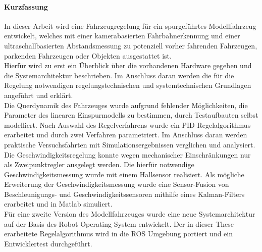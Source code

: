 
\cleardoublepage
\thispagestyle{plain}

\paragraph{Kurzfassung}
In dieser Arbeit wird eine Fahrzeugregelung für ein spurgeführtes Modellfahrzeug entwickelt, welches mit einer kamerabasierten Fahrbahnerkennung und einer ultraschallbasierten Abstandsmessung zu potenziell vorher fahrenden Fahr\-zeu\-gen, parkenden Fahrzeugen oder Objekten ausgestattet ist. \\

Hierfür wird zu erst ein Überblick über die vorhandenen Hardware gegeben und die Systemarchitektur beschrieben. Im Anschluss daran werden die für die Regelung notwendigen regelungstechnischen und systemtechnischen Grundlagen angeführt und erklärt.\\

Die Querdynamik des Fahrzeuges wurde aufgrund fehlender Möglichkeiten, die Parameter des linearen Einspurmodells zu bestimmen, durch Testaufbauten \mbox{selbst} modelliert. Nach Auswahl des Regelverfahrens wurde ein PID-Regelalgorithmus erarbeitet und durch zwei Verfahren parametriert. Im Anschluss daran werden praktische Versuchsfahrten mit Simulationsergebnissen verglichen und analysiert.\\

Die Geschwindigkeitsregelung konnte wegen mechanischer Einschränkungen nur als Zweipunktregler ausgelegt werden. Die hierfür notwendige Ge\-schwindigkeits\-messung wurde mit einem Hallsensor realisiert. Als mögliche Erweiterung der Ge\-schwin\-dig\-keits\-messung wurde eine Sensor-Fusion von Beschleunigungs- und Ge\-schwin\-digkeits\-sensoren mithilfe eines Kalman-Filters erarbeitet und in Matlab simuliert.\\

Für eine zweite Version des Modellfahrzeuges wurde eine neue Systemarchitektur auf der Basis des Robot Operating System entwickelt. Der in dieser These er\-ar\-bei\-tete Regelalgorithmus wird in die ROS Umgebung portiert und ein Entwicklertest durchgeführt.
